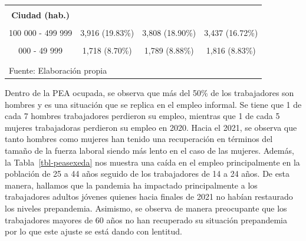 \documentclass[
  letterpaper,
  12pt,
  oneside,
  spanish,
  doublespacing,
  headsepline,
  parskip]{MastersDoctoralThesis}
\begin{document}
\begin{table}[H]
\begin{tabular}{cccc}
\addlinespace
\cellcolor{gray!6}{Lima Metropolitana} & \cellcolor{gray!6}{8,317 (42.12\%)} & \cellcolor{gray!6}{8,467 (42.01\%)} & \cellcolor{gray!6}{8,641 (42.03\%)}\\
\textbf{Ciudad (hab.)} &  &  & \\
\cellcolor{gray!6}{500 000 a más} & \cellcolor{gray!6}{9,718 (49.21\%)} & \cellcolor{gray!6}{9,926 (49.25\%)} & \cellcolor{gray!6}{10,259 (49.90\%)}\\
100 000 - 499 999 & 3,916 (19.83\%) & 3,808 (18.90\%) & 3,437 (16.72\%)\\
\cellcolor{gray!6}{50 000 - 99 999} & \cellcolor{gray!6}{1,131 (5.73\%)} & \cellcolor{gray!6}{1,071 (5.32\%)} & \cellcolor{gray!6}{1,152 (5.60\%)}\\
\addlinespace
20 000 - 49 999 & 1,718 (8.70\%) & 1,789 (8.88\%) & 1,816 (8.83\%)\\
\cellcolor{gray!6}{2 000 - 19 999} & \cellcolor{gray!6}{3,264 (16.53\%)} & \cellcolor{gray!6}{3,559 (17.66\%)} & \cellcolor{gray!6}{3,895 (18.94\%)}\\
\bottomrule
\multicolumn{4}{l}{\textsuperscript{} Fuente: Elaboración propia}\\
\end{tabular}
\endgroup{}
\end{table}

Dentro de la PEA ocupada, se observa que más del 50\% de los
trabajadores son hombres y es una situación que se replica en el empleo
informal. Se tiene que 1 de cada 7 hombres trabajadores perdieron su
empleo, mientras que 1 de cada 5 mujeres trabajadoras perdieron su
empleo en 2020. Hacia el 2021, se observa que tanto hombres como mujeres
han tenido una recuperación en términos del tamaño de la fuerza laboral
siendo más lento en el caso de las mujeres. Además, la
Tabla~\ref{tbl-peasexeda} nos muestra una caída en el empleo
principalmente en la población de 25 a 44 años seguido de los
trabajadores de 14 a 24 años. De esta manera, hallamos que la pandemia
ha impactado principalmente a los trabajadores adultos jóvenes quienes
hacia finales de 2021 no habían restaurado los niveles prepandemia.
Asimismo, se observa de manera preocupante que los trabajadores mayores
de 60 años no han recuperado su situación prepandemia por lo que este
ajuste se está dando con lentitud.
\end{document}
